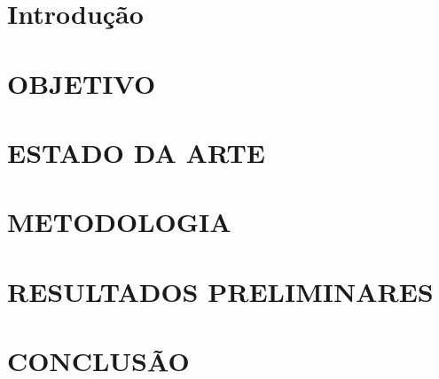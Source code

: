\documentclass[
  a4paper,%
  12pt,%
  english,%
  brazilian,%
]{article}
\begin{document}





\section*{Introdução}%
\label{sect:intro}


\section*{OBJETIVO} \label{sect:obj}



\section*{ESTADO DA ARTE} \label{sect:estadoarte}



\section*{METODOLOGIA} \label{sect:metodologia}



\section*{RESULTADOS PRELIMINARES}\label{sect:resultados}



\section*{CONCLUSÃO}\label{sect:conclusao}



\printbibliography

%

\end{document}
